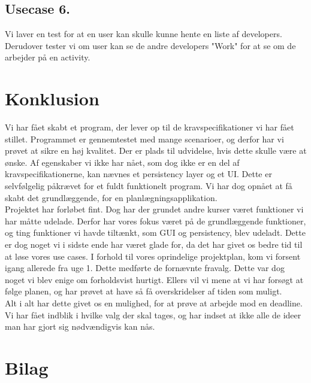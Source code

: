 \documentclass[a4paper,12pt]{article}
\begin{document}
\subsection*{Usecase 6.}
Vi laver en test for at en user kan skulle kunne hente en liste af developers. Derudover tester vi om user kan se de andre developers "Work" for at se om de arbejder på en activity.

\section{Konklusion}
Vi har fået skabt et program, der lever op til de kravspecifikationer vi har fået stillet. Programmet er gennemtestet med mange scenarioer, og derfor har vi prøvet at sikre en høj kvalitet. Der er plads til udvidelse, hvis dette skulle være at ønske. Af egenskaber vi ikke har nået, som dog ikke er en del af kravspecifikationerne, kan nævnes et persistency layer og et UI. Dette er selvfølgelig påkrævet for et fuldt funktionelt program. Vi har dog opnået at få skabt det grundlæggende, for en planlægningsapplikation.\\ 
Projektet har forløbet fint. Dog har der grundet andre kurser været funktioner vi har måtte udelade. Derfor har vores fokus været på de grundlæggende funktioner, og ting funktioner vi havde tiltænkt, som GUI og persistency, blev udeladt. Dette er dog noget vi i sidste ende har været glade for, da det har givet os bedre tid til at løse vores use cases. I forhold til vores oprindelige projektplan, kom vi forsent igang allerede fra uge 1. Dette medførte de fornævnte fravalg. Dette var dog noget vi blev enige om forholdsvist hurtigt. Ellers vil vi mene at vi har forsøgt at følge planen, og har prøvet at have så få overskridelser af tiden som muligt.\\
Alt i alt har dette givet os en mulighed, for at prøve at arbejde mod en deadline. Vi har fået indblik i hvilke valg der skal tages, og har indset at ikke alle de ideer man har gjort sig nødvændigvis kan nås.
\newpage
\section{Bilag}
\end{document}
